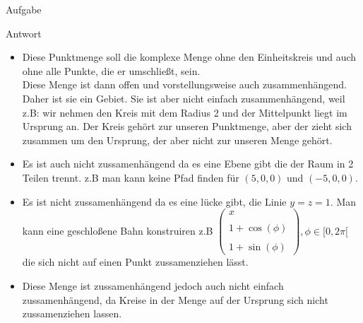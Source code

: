 \documentclass{scrartcl}
\begin{document}
\begin{section}{Aufgabe}
\begin{subsection}{Antwort}
\begin{itemize}
\item[b)] Diese Punktmenge soll die komplexe Menge ohne den Einheitskreis und auch ohne alle Punkte, die er umschließt, sein. \\
Diese Menge ist dann offen und vorstellungsweise auch zusammenhängend. Daher ist sie ein Gebiet. Sie ist aber nicht einfach zusammenhängend, weil z.B: wir nehmen den Kreis mit dem Radius 2 und der Mittelpunkt liegt im Ursprung an. Der Kreis gehört zur unseren Punktmenge, aber der zieht sich zusammen um den Ursprung, der aber nicht zur unseren Menge gehört.\\
\item[c)] Es ist auch nicht zussamenhängend da es eine Ebene gibt die der Raum in 2 Teilen trennt. z.B man kann keine Pfad finden für $(5,0,0)$ und $(-5,0,0)$.
\item[d)] Es ist nicht zussamenhängend da es eine lücke gibt, die Linie $y=z=1$.
Man kann eine geschloßene Bahn konstruiren z.B $\left(
\begin{array}{c}
 x\\\\1+\cos(\phi)\\\\1+\sin(\phi)
\end{array}
\right),\phi\in[0,2\pi[$ die sich nicht auf einen Punkt zussamenziehen lässt.
\item[e)] Diese Menge ist zussamenhängend jedoch auch nicht einfach zussamenhängend, da Kreise in der Menge auf der Ursprung sich nicht zussamenziehen lassen. 
            \end{itemize}
    \end{subsection}  
\end{section}
\end{document}
